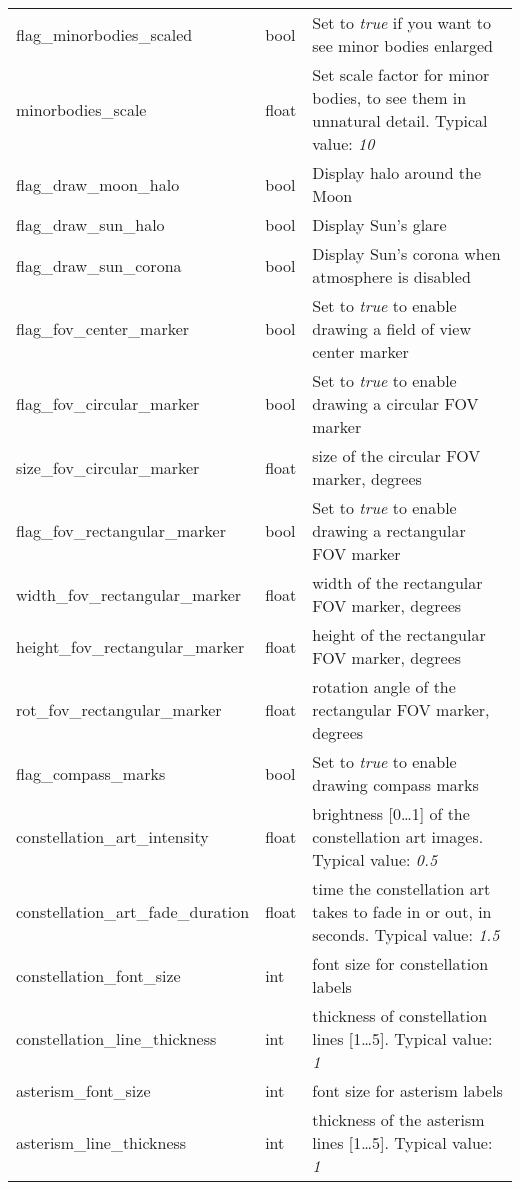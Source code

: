\begin{longtable}{l|l|p{77mm}}
flag\_minorbodies\_scaled     & bool  & Set to \emph{true} if you want to see minor bodies enlarged \\
minorbodies\_scale            & float & Set scale factor for minor bodies, to see them in unnatural detail. Typical value: \emph{10}\\
\midrule
flag\_draw\_moon\_halo           & bool  & Display halo around the Moon\\
flag\_draw\_sun\_halo            & bool  & Display Sun's glare\\
flag\_draw\_sun\_corona          & bool  & Display Sun's corona when atmosphere is disabled\\
\midrule
flag\_fov\_center\_marker        & bool  & Set to \emph{true} to enable drawing a field of view center marker \\
flag\_fov\_circular\_marker      & bool  & Set to \emph{true} to enable drawing a circular FOV marker \\
size\_fov\_circular\_marker      & float & size of the circular FOV marker, degrees \\
flag\_fov\_rectangular\_marker   & bool  & Set to \emph{true} to enable drawing a rectangular FOV marker \\
width\_fov\_rectangular\_marker  & float & width of the rectangular FOV marker, degrees \\
height\_fov\_rectangular\_marker & float & height of the rectangular FOV marker, degrees \\
rot\_fov\_rectangular\_marker    & float & rotation angle of the rectangular FOV marker, degrees \\
flag\_compass\_marks             & bool  & Set to \emph{true} to enable drawing compass marks \\
\midrule
constellation\_art\_intensity      & float & brightness [0\ldots1] of the constellation art images. Typical value: \emph{0.5}\\%
constellation\_art\_fade\_duration & float & time the constellation art takes to fade in or out, in seconds. Typical value: \emph{1.5}\\%
constellation\_font\_size          & int   & font size for constellation labels\\%
constellation\_line\_thickness     & int   & thickness of constellation lines [1\ldots5]. Typical value: \emph{1}\\%
asterism\_font\_size               & int   & font size for asterism labels\\%
asterism\_line\_thickness          & int   & thickness of the asterism lines [1\ldots5]. Typical value: \emph{1}\\%

\end{longtable}
